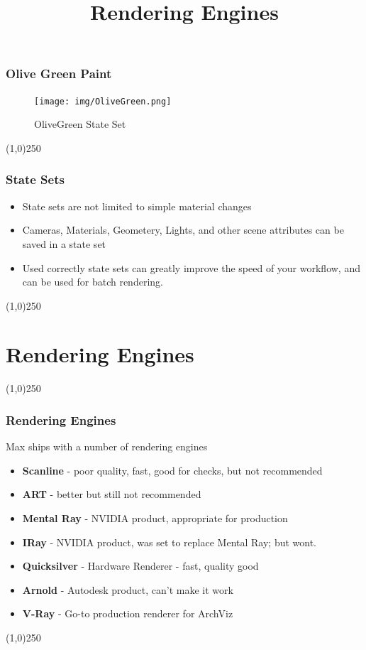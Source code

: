 \begin{frame}
\frametitle{Olive Green Paint}
\begin{figure}
	\centering
		\texttt{[image: img/OliveGreen.png]}
	\caption{OliveGreen State Set}
	\label{fig:OliveGreen}
\end{figure}
\end{frame}
\begin{center}\line(1,0){250}\end{center}


\begin{frame}
\frametitle{State Sets}
\begin{itemize}
	\item State sets are not limited to simple material changes
	\item Cameras, Materials, Geometery, Lights, and other scene attributes can be saved in a state set
	\item Used correctly state sets can greatly improve the speed of your workflow, and can be used for batch rendering.
\end{itemize}
\end{frame}
\begin{center}\line(1,0){250}\end{center}

\section{Rendering Engines}
\begin{frame}
\title[Rendering Engines]{Rendering Engines}
\titlepage
\end{frame}\begin{center}\line(1,0){250}\end{center}

\begin{frame}
\frametitle{Rendering Engines}
Max ships with a number of rendering engines
\begin{itemize}
	\item \textbf{Scanline} - poor quality, fast, good for checks, but not recommended
	\item \textbf{ART} - better but still not recommended
	\item \textbf{Mental Ray} - NVIDIA product, appropriate for production
	\item \textbf{IRay} - NVIDIA product, was set to replace Mental Ray; but wont.
	\item \textbf{Quicksilver} - Hardware Renderer - fast, quality good
	\item \textbf{Arnold} - Autodesk product, can't make it work
	\item \textbf{V-Ray} - Go-to production renderer for ArchViz
\end{itemize}
\end{frame}
\begin{center}\line(1,0){250}\end{center}



